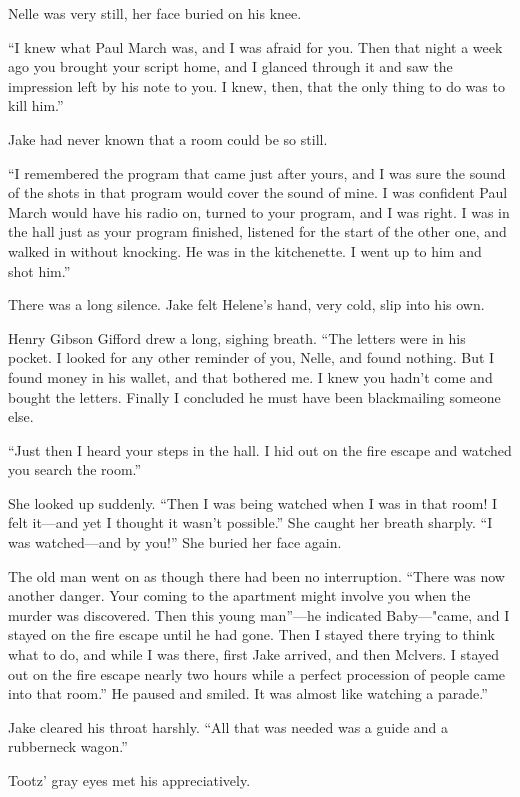 \documentclass{novel}
\begin{document}
Nelle was very still, her face buried on his knee.

“I knew what Paul March was, and I was afraid for you. Then that night a week ago you brought your script home, and I glanced through it and saw the impression left by his note to you. I knew, then, that the only thing to do was to kill him.”

Jake had never known that a room could be so still.

“I remembered the program that came just after yours, and I was sure the sound of the shots in that program would cover the sound of mine. I was confident Paul March would have his radio on, turned to your program, and I was right. I was in the hall just as your program finished, listened for the start of the other one, and walked in without knocking. He was in the kitchenette. I went up to him and shot him.”

There was a long silence. Jake felt Helene’s hand, very cold, slip into his own.

Henry Gibson Gifford drew a long, sighing breath. “The letters were in his pocket. I looked for any other reminder of you, Nelle, and found nothing. But I found money in his wallet, and that bothered me. I knew you hadn’t come and bought the letters. Finally I concluded he must have been blackmailing someone else.

“Just then I heard your steps in the hall. I hid out on the fire escape and watched you search the room.”

She looked up suddenly. “Then I was being watched when I was in that room! I felt it—and yet I thought it wasn’t possible.” She caught her breath sharply. “I was watched—and by you!” She buried her face again.

The old man went on as though there had been no interruption. “There was now another danger. Your coming to the apartment might involve you when the murder was discovered. Then this young man”—he indicated Baby—"came, and I stayed on the fire escape until he had gone. Then I stayed there trying to think what to do, and while I was there, first Jake arrived, and then Mclvers. I stayed out on the fire escape nearly two hours while a perfect procession of people came into that room.” He paused and smiled. It was almost like watching a parade.”

Jake cleared his throat harshly. “All that was needed was a guide and a rubberneck wagon.”

Tootz’ gray eyes met his appreciatively.
\end{document}
